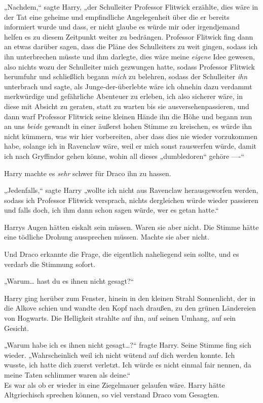 {„Nachdem,“ sagte Harry, „der Schulleiter Professor Flitwick erzählte, dies wäre in der Tat eine geheime und empfindliche Angelegenheit über die er bereits informiert wurde und dass, er nicht glaube es würde mir oder irgendjemand helfen es zu diesem Zeitpunkt weiter zu bedrängen. Professor Flitwick fing dann an etwas darüber sagen, dass die Pläne des Schulleiters zu weit gingen, sodass ich ihn unterbrechen müsste und ihm darlegte, dies wäre meine \emph{eigene} Idee gewesen, also nichts wozu der Schulleiter mich gezwungen hatte, sodass Professor Flitwick herumfuhr und schließlich begann \emph{mich} zu belehren, sodass der Schulleiter \emph{ihn} unterbrach und sagte, als Junge-der-überlebte wäre ich ohnehin dazu verdammt merkwürdige und gefährliche Abenteuer zu erleben, ich also sicherer wäre, in diese mit Absicht zu geraten, statt zu warten bis sie ausversehenpassieren, und dann warf Professor Flitwick seine kleinen Hände ihn die Höhe und begann nun an uns \emph{beide} gewandt in einer äußerst hohen Stimme zu kreischen, es würde ihn nicht kümmern, was wir hier vorbereiten, aber dass dies nie wieder vorzukommen habe, solange ich in Ravenclaw wäre, weil er mich sonst rauswerfen würde, damit ich nach Gryffindor gehen könne, wohin all dieses „dumbledoren“ gehöre ----“

Harry machte es \emph{sehr} schwer für Draco ihn zu hassen.

„Jedenfalls,“ sagte Harry „wollte ich nicht aus Ravenclaw herausgeworfen werden, sodass ich Professor Flitwick versprach, nichts dergleichen würde wieder passieren und falls doch, ich ihm dann schon sagen würde, wer es getan hatte.“

Harrys Augen hätten eiskalt sein müssen. Waren sie aber nicht. Die Stimme hätte eine tödliche Drohung aussprechen müssen. Machte sie aber nicht.

Und Draco erkannte die Frage, die eigentlich naheliegend sein sollte, und es verdarb die Stimmung sofort.

„Warum… hast du es ihnen nicht gesagt?“

Harry ging herüber zum Fenster, hinein in den kleinen Strahl Sonnenlicht, der in die Alkove schien und wandte den Kopf nach draußen, zu den grünen Ländereien von Hogwarts. Die Helligkeit strahlte auf ihn, auf seinen Umhang, auf sein Gesicht.

„Warum habe ich es ihnen nicht gesagt…?“ fragte Harry. Seine Stimme fing sich wieder. „Wahrscheinlich weil ich nicht wütend auf dich werden konnte. Ich wusste, ich hatte dich zuerst verletzt. Ich würde es nicht einmal fair nennen, da meine Taten schlimmer waren als deine.“\\ Es war als ob er wieder in eine Ziegelmauer gelaufen wäre. Harry hätte Altgriechisch sprechen können, so viel verstand Draco vom Gesagten.

}
